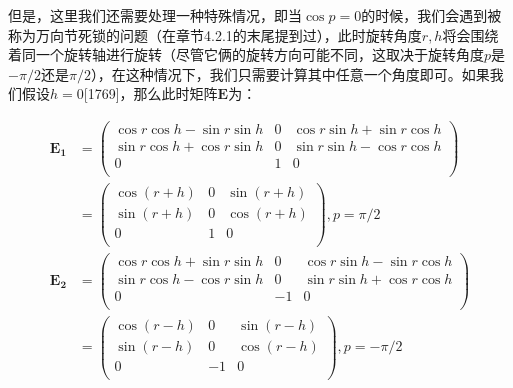 \documentclass[
  paper=a4,
  ,captions=tableheading
]{scrartcl}
\begin{document}
但是，这里我们还需要处理一种特殊情况，即当\(\cos p = 0\)的时候，我们会遇到被称为万向节死锁的问题（在章节4.2.1的末尾提到过），此时旋转角度\(r,h\)将会围绕着同一个旋转轴进行旋转（尽管它俩的旋转方向可能不同，这取决于旋转角度\(p\)是\(-\pi/2\)还是\(\pi/2\)），在这种情况下，我们只需要计算其中任意一个角度即可。如果我们假设\(h=0\){[}1769{]}，那么此时矩阵\(\mathbf{E}\)为：

\[
  \begin{aligned}{}
    \mathbf{E_1} & =
    \left( \begin{array}{ccc}
               \cos r \cos h - \sin r \sin h & 0 & \cos r \sin h + \sin r \cos h \\
               \sin r \cos h + \cos r \sin h & 0 & \sin r \sin h - \cos r \cos h \\
               0                             & 1 & 0                             \\
             \end{array}  \right)
    \\[5mm]&=
    \left( \begin{array}{ccc}
               \cos (r+h) & 0 & \sin (r+h) \\
               \sin (r+h) & 0 & \cos (r+h) \\
               0          & 1 & 0          \\
             \end{array}  \right) ,p = \pi/2
    \\[10mm]
    \mathbf{E_2} & =
    \left( \begin{array}{ccc}
               \cos r \cos h + \sin r \sin h & 0  & \cos r \sin h - \sin r \cos h \\
               \sin r \cos h - \cos r \sin h & 0  & \sin r \sin h + \cos r \cos h \\
               0                             & -1 & 0                             \\
             \end{array}  \right)
    \\[5mm]&=
    \left( \begin{array}{ccc}
               \cos (r-h) & 0  & \sin (r-h) \\
               \sin (r-h) & 0  & \cos (r-h) \\
               0          & -1 & 0          \\
             \end{array}  \right) ,p = -\pi/2
  \end{aligned}
  \tag{4.25.1}
\]
\end{document}
